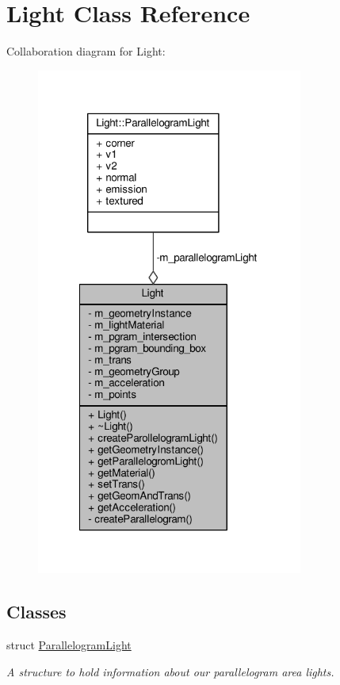 \hypertarget{class_light}{\section{Light Class Reference}
\label{class_light}
}


Collaboration diagram for Light\-:
\nopagebreak
\begin{figure}[H]
\begin{center}
\leavevmode
\includegraphics[width=248pt]{class_light__coll__graph}
\end{center}
\end{figure}
\subsection*{Classes}
\begin{DoxyCompactItemize}
\item 
struct \hyperlink{struct_light_1_1_parallelogram_light}{Parallelogram\-Light}
\begin{DoxyCompactList}\small\item\em A structure to hold information about our parallelogram area lights. \end{DoxyCompactList}\end{DoxyCompactItemize}
